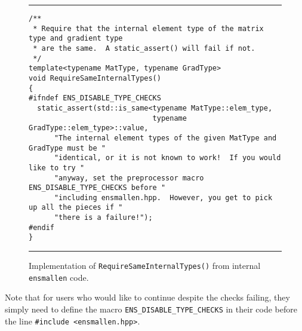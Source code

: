 \begin{figure}[t]
\hrule
\vspace{1ex}
\begin{verbatim}
/**
 * Require that the internal element type of the matrix type and gradient type
 * are the same.  A static_assert() will fail if not.
 */
template<typename MatType, typename GradType>
void RequireSameInternalTypes()
{
#ifndef ENS_DISABLE_TYPE_CHECKS
  static_assert(std::is_same<typename MatType::elem_type,
                             typename GradType::elem_type>::value,
      "The internal element types of the given MatType and GradType must be "
      "identical, or it is not known to work!  If you would like to try "
      "anyway, set the preprocessor macro ENS_DISABLE_TYPE_CHECKS before "
      "including ensmallen.hpp.  However, you get to pick up all the pieces if "
      "there is a failure!");
#endif
}
\end{verbatim}
\hrule
\vspace*{-0.5em}
\caption{Implementation of {\tt RequireSameInternalTypes()} from internal {\tt
ensmallen} code.}
\label{fig:rsit}
\end{figure}

Note that for users who would like to continue despite the checks failing, they
simply need to define the macro {\tt ENS\_DISABLE\_TYPE\_CHECKS} in their code
before the line {\tt \#include <ensmallen.hpp>}.
